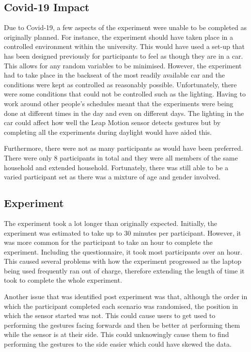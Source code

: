 \documentclass{l4proj}
\begin{document}
\subsection{Covid-19 Impact}
Due to Covid-19, a few aspects of the experiment were unable to be completed as originally planned. For instance, the experiment should have taken place in a controlled environment within the university. This would have used a set-up that has been designed previously for participants to feel as though they are in a car. This allows for any random variables to be minimised. However, the experiment had to take place in the backseat of the most readily available car and the conditions were kept as controlled as reasonably possible. Unfortunately, there were some conditions that could not be controlled such as the lighting. Having to work around other people’s schedules meant that the experiments were being done at different times in the day and even on different days. The lighting in the car could affect how well the Leap Motion sensor detects gestures but by completing all the experiments during daylight would have aided this. 

Furthermore, there were not as many participants as would have been preferred. There were only 8 participants in total and they were all members of the same household and extended household. Fortunately, there was still able to be a varied participant set as there was a mixture of age and gender involved.

\subsection{Experiment}
The experiment took a lot longer than originally expected. Initially, the experiment was estimated to take up to 30 minutes per participant. However, it was more common for the participant to take an hour to complete the experiment. Including the questionnaire, it took most participants over an hour. This caused several problems with how the experiment progressed as the laptop being used frequently ran out of charge, therefore extending the length of time it took to complete the whole experiment.

Another issue that was identified post experiment was that, although the order in which the participant completed each scenario was randomised, the position in which the sensor started was not. This could cause users to get used to performing the gestures facing forwards and then be better at performing them while the sensor is at their side. This could unknowingly cause them to find performing the gestures to the side easier which could have skewed the data.
\end{document}
